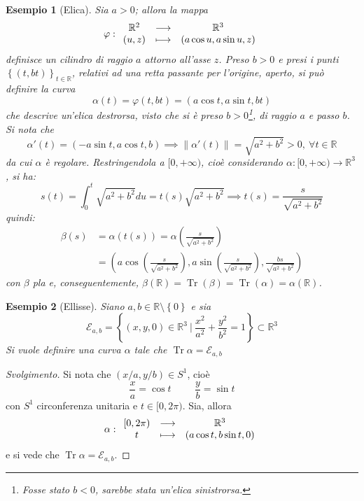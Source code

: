 \documentclass[12pt]{scrartcl}
\theoremstyle{style}
\newtheorem{esempio}{Esempio}[section]
\newenvironment{svolgimento}{\renewcommand\qedsymbol{$\blacksquare$}\begin{proof}[Svolgimento]}{\end{proof}}
\numberwithin{equation}{subsection}
\begin{document}
\begin{esempio}
	[Elica]
Sia $a > 0$; allora la mappa
\[
\varphi :
\begin{array}
	{c c c}
	\mathbb{R}^2 & \longrightarrow & \mathbb{R}^3\\
	(u,z) &\longmapsto & (a \cos u , a \sin u , z)
\end{array}
\] 
definisce un cilindro di raggio $a$ attorno all'asse $z$.
Preso $b > 0$ e presi i punti $\left\{ (t,bt) \right\} _{t \in \mathbb{R}} $, relativi ad una retta passante per l'origine, aperto, si pu\`o definire la curva 
\[
\alpha (t) = \varphi (t,bt) = (a \cos t , a \sin t , bt)
\] 
che descrive un'\textit{elica destrorsa}, visto che si \`e preso $b>0$\footnote{Fosse stato $b<0$, sarebbe stata un'\textit{elica sinistrorsa}.}, di raggio $a$ e passo $b$.
Si nota che
\[
\alpha '(t) = (-a \sin t, a \cos t , b) \implies \left\lVert \alpha '(t) \right\rVert =\sqrt{a^2 + b^2} > 0, \ \forall t \in \mathbb{R}
\] 
da cui $\alpha $ \`e regolare. 
Restringendola a $[0,+\infty)$, cio\`e considerando $\alpha : [0,+\infty) \to \mathbb{R}^{3} $, si ha:
\[
	s(t) = \int_{0} ^t \sqrt{a^2 + b^2 }  du = t(s) \sqrt{a^2 + b^2} \implies t(s) = \frac{s}{\sqrt{a^2 +b^2}}
\] 
quindi:
\[
\begin{split}
		 \beta (s) &= \alpha (t(s)) = \alpha  \left(\frac{s}{\sqrt{a^2 + b^2} }\right) \\
	&= \left(a \cos \left(\frac{s}{\sqrt{a^2+b^2} }\right) , a\sin \left(\frac{s}{\sqrt{a^2 + b^2} }\right),\frac{bs}{\sqrt{a^2 + b^2} } \right)
	\end{split} 
\] 
con $\beta $ pla e, conseguentemente, $\beta (\mathbb{R}) = \operatorname{Tr} (\beta ) = \operatorname{Tr} (\alpha ) = \alpha (\mathbb{R})$.
\end{esempio}
\begin{esempio}
	[Ellisse]
	Siano $a,b \in \mathbb{R}\setminus\left\{ 0 \right\} $ e sia 
	\[
	\mathcal{E} _{a,b} = \left\{ (x,y,0) \in \mathbb{R}^3  \ \bigg\lvert \ \frac{x^2}{a^2} + \frac{y^2}{b^2} = 1\right\} \subset \mathbb{R}^3
	\] 
	Si vuole definire una curva $\alpha $ tale che $\operatorname{Tr} \alpha = \mathcal{E} _{a,b} $
\end{esempio}
	\begin{svolgimento}
		Si nota che $(x /  a , y / b) \in S^1$, cio\`e
	\[
	\frac{x}{a} = \cos t \hspace{1cm}\frac{y}{b} = \sin t
	\] 
	con $S^1$ circonferenza unitaria e $t\in [0,2\pi)$.
	Sia, allora
	\[
\alpha :
	\begin{array}
		{c c c}
		[0,2\pi) &\longrightarrow & \mathbb{R}^3\\
		t & \longmapsto & (a \cos t , b \sin t, 0)
	\end{array}
	\] 
 e si vede che $\operatorname{Tr} \alpha  = \mathcal{E} _{a,b} $.

	\end{svolgimento}
\end{document}
